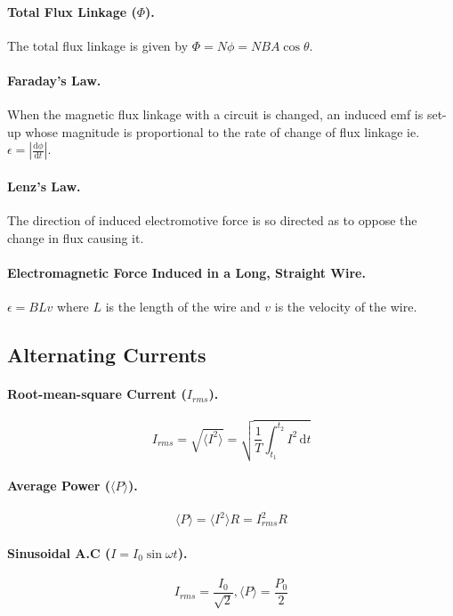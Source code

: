\documentclass{article}
\begin{document}
\paragraph{Total Flux Linkage ($\Phi$).} The total flux linkage is given by $\Phi = N\phi = NBA\cos\theta$.

\paragraph{Faraday's Law.} When the magnetic flux linkage with a circuit is changed, an induced emf is set-up whose magnitude is proportional to the rate of change of flux linkage ie. $\epsilon = \left|\frac{\mathrm{d}\phi}{\mathrm{d}t}\right|$.

\paragraph{Lenz's Law.} The direction of induced electromotive force is so directed as to oppose the change in flux causing it.

\paragraph{Electromagnetic Force Induced in a Long, Straight Wire.} $\epsilon = BLv$ where $L$ is the length of the wire and $v$ is the velocity of the wire.

\subsection{Alternating Currents}

\paragraph{Root-mean-square Current ($I_{rms}$).} \begin{equation}
I_{rms} = \sqrt{\langle I^2 \rangle} = \sqrt{\frac{1}{T} \int^{t_2}_{t_1} \! I^2 \, \mathrm{d}t}
\end{equation}

\paragraph{Average Power ($\langle P \rangle$).} \begin{equation}
\langle P \rangle = \langle I^2 \rangle R = I^2_{rms}R
\end{equation}

\paragraph{Sinusoidal A.C ($I = I_0\sin{\omega t}$).} \begin{equation}
I_{rms} = \frac{I_0}{\sqrt{2}}, \langle P \rangle = \frac{P_0}{2}
\end{equation}
\end{document}
